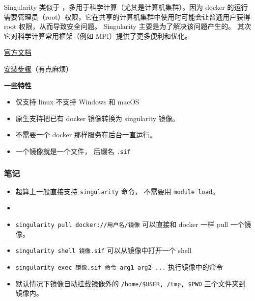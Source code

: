 
\begin{issues}
\issueDraft
\end{issues}

Singularity 类似于 ，多用于科学计算（尤其是计算机集群）。因为 docker 的运行需要管理员（root）权限，它在共享的计算机集群中使用时可能会让普通用户获得 root 权限，从而导致安全问题。 Singularity 主要是为了解决该问题产生的。 其次它对科学计算常用框架（例如 MPI）提供了更多便利和优化。

\href{https://docs.sylabs.io/guides/3.0/user-guide/index.html}{官方文档}

\href{https://docs.sylabs.io/guides/3.0/user-guide/quick_start.html#quick-installation-steps}{安装步骤}（有点麻烦）

\textbf{一些特性}
\begin{itemize}
\item 仅支持 linux 不支持 Windows 和 macOS
\item 原生支持把已有 docker 镜像转换为 singularity 镜像。
\item 不需要一个 docker 那样服务在后台一直运行。
\item 一个镜像就是一个文件， 后缀名 \verb|.sif|
\end{itemize}


\subsubsection{笔记}
\begin{itemize}
\item 超算上一般直接支持 \verb|singularity| 命令， 不需要用 \verb|module load|。
\item \item \verb|singularity pull docker://用户名/镜像| 可以直接和 docker 一样 pull 一个镜像。
\item \verb|singularity shell 镜像.sif| 可以从镜像中打开一个 shell
\item \verb|singularity exec 镜像.sif 命令 arg1 arg2 ...| 执行镜像中的命令
\item 默认情况下镜像自动挂载镜像外的 \verb|/home/$USER, /tmp, $PWD| 三个文件夹到镜像内。
\end{itemize}
